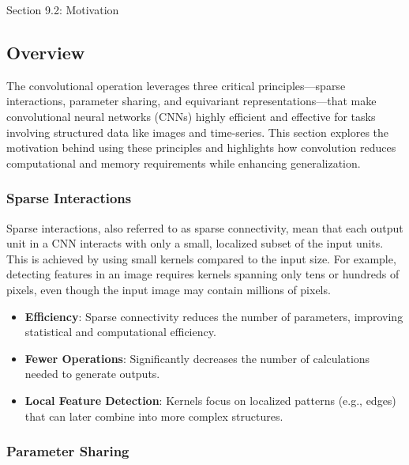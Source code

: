 \begin{notes}{Section 9.2: Motivation}
    \subsection*{Overview}

    The convolutional operation leverages three critical principles—sparse interactions, parameter sharing, and equivariant representations—that make convolutional neural networks (CNNs) highly efficient 
    and effective for tasks involving structured data like images and time-series. This section explores the motivation behind using these principles and highlights how convolution reduces computational 
    and memory requirements while enhancing generalization.
    
    \subsubsection*{Sparse Interactions}
    
    Sparse interactions, also referred to as sparse connectivity, mean that each output unit in a CNN interacts with only a small, localized subset of the input units. This is achieved by using small kernels 
    compared to the input size. For example, detecting features in an image requires kernels spanning only tens or hundreds of pixels, even though the input image may contain millions of pixels.
    
    \begin{highlight}
        \begin{itemize}
            \item \textbf{Efficiency}: Sparse connectivity reduces the number of parameters, improving statistical and computational efficiency.
            \item \textbf{Fewer Operations}: Significantly decreases the number of calculations needed to generate outputs.
            \item \textbf{Local Feature Detection}: Kernels focus on localized patterns (e.g., edges) that can later combine into more complex structures.
        \end{itemize}
    \end{highlight}
    
    \subsubsection*{Parameter Sharing}
    

\end{notes}
